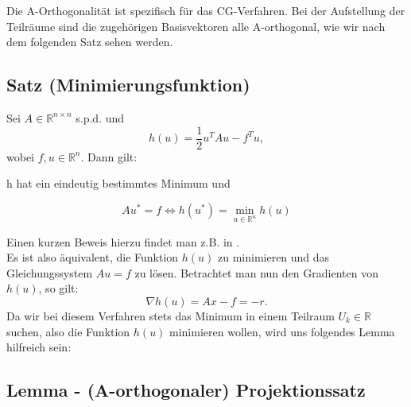 Die A-Orthogonalität ist spezifisch für das CG-Verfahren. Bei der Aufstellung der Teilräume sind die zugehörigen Basisvektoren alle A-orthogonal, wie wir nach dem folgenden Satz sehen werden.

\subsection{Satz (Minimierungsfunktion)}
Sei $A\in\mathbb{R}^{n \times n}$ s.p.d. und
\begin{equation}
h(u) = \frac {1} {2} u^{T}Au - f^{T}u,
\end{equation}
wobei $f,u \in \mathbb{R}^{n}$. Dann gilt:
\begin{center}
h hat ein eindeutig bestimmtes Minimum und
\end{center}
\begin{equation}
Au^{*} = f \Longleftrightarrow h(u^{*}) = \underset{u\in\mathbb{R}^{n}}{\min} h(u)
\end{equation}

Einen kurzen Beweis hierzu findet man z.B. in \cite{DR6}.\\
Es ist also äquivalent, die Funktion $h(u)$ zu minimieren und das Gleichungssystem $Au = f$ zu lösen. Betrachtet man nun den Gradienten von $h(u)$, so gilt:
\begin{equation}
\nabla h(u) = Ax - f = -r.
\end{equation}
Da wir bei diesem Verfahren stets das Minimum in einem Teilraum $U_{k} \in \mathbb{R}$ suchen, also die Funktion $h(u)$ minimieren wollen, wird uns folgendes Lemma hilfreich sein:


\subsection{Lemma - (A-orthogonaler) Projektionssatz}\label{s.Projektionssatz}

